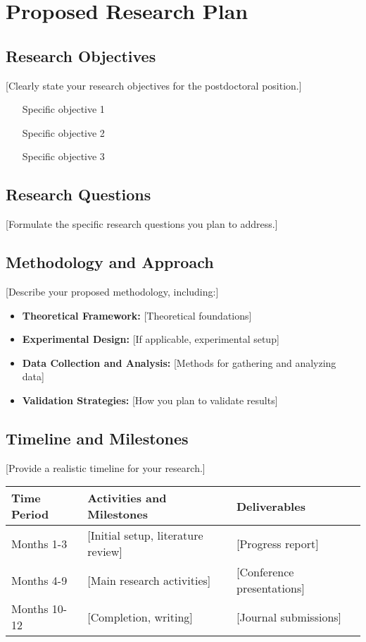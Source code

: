 \documentclass[11pt,a4paper]{article}
\begin{document}
\section{Proposed Research Plan}
\subsection{Research Objectives}
[Clearly state your research objectives for the postdoctoral position.]

\begin{enumerate}[label=\textbf{Objective \arabic*:}, leftmargin=2em, itemsep=0.5em]
    \item [Specific objective 1]
    \item [Specific objective 2]
    \item [Specific objective 3]
\end{enumerate}

\subsection{Research Questions}
[Formulate the specific research questions you plan to address.]

\subsection{Methodology and Approach}
[Describe your proposed methodology, including:]

\begin{itemize}
    \item \textbf{Theoretical Framework:} [Theoretical foundations]
    \item \textbf{Experimental Design:} [If applicable, experimental setup]
    \item \textbf{Data Collection and Analysis:} [Methods for gathering and analyzing data]
    \item \textbf{Validation Strategies:} [How you plan to validate results]
\end{itemize}

\subsection{Timeline and Milestones}
[Provide a realistic timeline for your research.]

\begin{center}
\begin{tabular}{|p{2cm}|p{8cm}|p{2cm}|}
\hline
\textbf{Time Period} & \textbf{Activities and Milestones} & \textbf{Deliverables} \\
\hline
Months 1-3 & [Initial setup, literature review] & [Progress report] \\
\hline
Months 4-9 & [Main research activities] & [Conference presentations] \\
\hline
Months 10-12 & [Completion, writing] & [Journal submissions] \\
\hline
\end{tabular}
\end{center}
\end{document}

